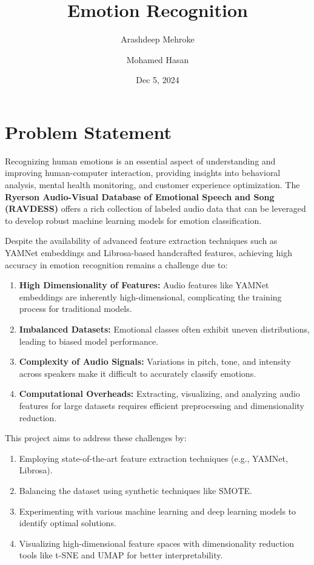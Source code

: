 \documentclass{article}
\title{Emotion Recognition}
\author{Arashdeep Mehroke \and Mohamed Hasan}
\date{Dec 5, 2024}
\begin{document}
\maketitle
\section{Problem Statement}

Recognizing human emotions is an essential aspect of understanding and improving human-computer interaction, 
providing insights into behavioral analysis, mental health monitoring, and customer experience optimization. 
The \textbf{Ryerson Audio-Visual Database of Emotional Speech and Song (RAVDESS)} offers a rich collection of 
labeled audio data that can be leveraged to develop robust machine learning models for emotion classification.

Despite the availability of advanced feature extraction techniques such as YAMNet embeddings and Librosa-based 
handcrafted features, achieving high accuracy in emotion recognition remains a challenge due to:
\begin{enumerate}
    \item \textbf{High Dimensionality of Features:} Audio features like YAMNet embeddings are inherently high-dimensional, 
    complicating the training process for traditional models.
    \item \textbf{Imbalanced Datasets:} Emotional classes often exhibit uneven distributions, leading to biased model 
    performance.
    \item \textbf{Complexity of Audio Signals:} Variations in pitch, tone, and intensity across speakers make it difficult 
    to accurately classify emotions.
    \item \textbf{Computational Overheads:} Extracting, visualizing, and analyzing audio features for large datasets 
    requires efficient preprocessing and dimensionality reduction.
\end{enumerate}

This project aims to address these challenges by:
\begin{enumerate}
    \item Employing state-of-the-art feature extraction techniques (e.g., YAMNet, Librosa).
    \item Balancing the dataset using synthetic techniques like SMOTE.
    \item Experimenting with various machine learning and deep learning models to identify optimal solutions.
    \item Visualizing high-dimensional feature spaces with dimensionality reduction tools like t-SNE and UMAP for 
    better interpretability.
\end{enumerate}
\end{document}
